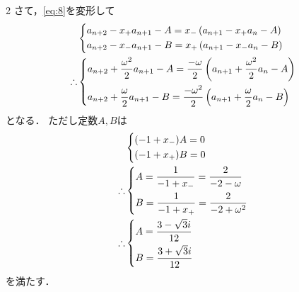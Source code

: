 \documentclass[../../main.tex]{subfiles}
\begin{document}
\begin{multicols}{2}
  さて，\cref{eq:8}を変形して
  \begin{align}
    &
    \begin{dcases}
      a_{n+2} -x_{+}a_{n+1} - A = x_{-}\left(a_{n+1} -x_{+} a_n - A\right) \\
      a_{n+2} -x_{-}a_{n+1} - B = x_{+}\left(a_{n+1} -x_{-} a_n - B\right)
    \end{dcases}                                        \\
    \therefore
    &
    \begin{dcases}
      a_{n+2} + \dfrac{\omega^2}{2}a_{n+1} - A = \dfrac{-\omega}{2}\left(a_{n+1} + \dfrac{\omega^2}{2}a_n - A\right) \\
      a_{n+2} + \dfrac{\omega}{2}a_{n+1} - B = \dfrac{-\omega^2}{2}\left(a_{n+1} + \dfrac{\omega}{2}a_n - B\right)
    \end{dcases} \label{eq:11}
  \end{align}
  となる．
  ただし定数$A,B$は
  \begin{align}
    &
    \begin{dcases}
      (-1 + x_{-})A = 0 \\
      (-1 + x_{+})B = 0
    \end{dcases}                                                          \\
    \therefore
    &
    \begin{dcases}
      A = \dfrac{1}{-1 + x_{-}} = \dfrac{2}{-2 - \omega} \\
      B = \dfrac{1}{-1 + x_{+}} = \dfrac{2}{-2 + \omega^2}
    \end{dcases} \\
    \therefore
    &
    \begin{dcases}
      A=\dfrac{3-\sqrt{3}i}{12} \\
      B=\dfrac{3+\sqrt{3}i}{12}
    \end{dcases}   \label{eq:12}
  \end{align}
  を満たす．


\end{multicols}
\end{document}
